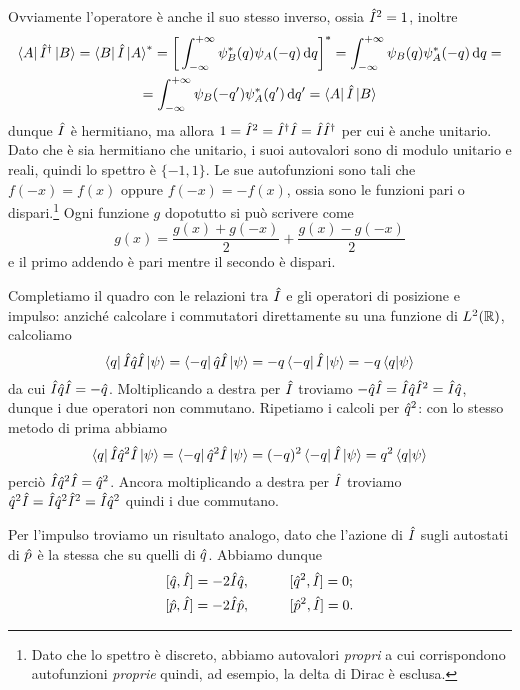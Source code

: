 Ovviamente l'operatore è anche il suo stesso inverso, ossia $\hat{I}^2=1$, inoltre
\begin{multline}
	\left\langle{A}\right|{\hat{I}}^\dagger\left|{B}\right\rangle=\left\langle{B}\right|\hat{I}\left|{A}\right\rangle^*=\bigg[\int_{-\infty}^{+\infty}\psi_B^*(q)\psi_A(-q)\,\textup{d} q\bigg]^*=\int_{-\infty}^{+\infty}\psi_B(q)\psi_A^*(-q)\,\textup{d} q=\\
	=\int_{-\infty}^{+\infty}\psi_B(-q')\psi_A^*(q')\,\textup{d} q'=\left\langle{A}\right|\hat{I}\left|{B}\right\rangle
	\label{eq:operatore-inversione-spaziale-hermitiano}
\end{multline}
dunque $\hat{I}$ è hermitiano, ma allora $1=\hat{I}^2={\hat{I}}^\dagger\hat{I}=\hat{I}{\hat{I}}^\dagger$ per cui è anche unitario.
Dato che è sia hermitiano che unitario, i suoi autovalori sono di modulo unitario e reali, quindi lo spettro è $\{-1,1\}$.
Le sue autofunzioni sono tali che $f(-x)=f(x)$ oppure $f(-x)=-f(x)$, ossia sono le funzioni pari o dispari.\footnote{Dato che lo spettro è discreto, abbiamo autovalori \emph{propri} a cui corrispondono autofunzioni \emph{proprie} quindi, ad esempio, la delta di Dirac è esclusa.}
Ogni funzione $g$ dopotutto si può scrivere come
\begin{equation}
	g(x)=\frac{g(x)+g(-x)}2+\frac{g(x)-g(-x)}2
	\label{eq:decomposizione-funzione-pari-dispari}
\end{equation}
e il primo addendo è pari mentre il secondo è dispari.

Completiamo il quadro con le relazioni tra $\hat{I}$ e gli operatori di posizione e impulso: anzich\'e calcolare i commutatori direttamente su una funzione di $L^2(\mathbb{R})$, calcoliamo
\begin{equation}
	\left\langle{q}\right|\hat{I}\hat{q}\hat{I}\left|{\psi}\right\rangle=\left\langle{-q}\right|\hat{q}\hat{I}\left|{\psi}\right\rangle=-q\left\langle{-q}\right|\hat{I}\left|{\psi}\right\rangle=-q\left\langle{q}\middle|{\psi}\right\rangle
\end{equation}
da cui $\hat{I}\hat{q}\hat{I}=-\hat{q}$.
Moltiplicando a destra per $\hat{I}$ troviamo $-\hat{q}\hat{I}=\hat{I}\hat{q}\hat{I}^2=\hat{I}\hat{q}$, dunque i due operatori non commutano.
Ripetiamo i calcoli per $\hat{q}^2$: con lo stesso metodo di prima abbiamo
\begin{equation}
	\left\langle{q}\right|\hat{I}\hat{q}^2\hat{I}\left|{\psi}\right\rangle=\left\langle{-q}\right|\hat{q}^2\hat{I}\left|{\psi}\right\rangle=(-q)^2\left\langle{-q}\right|\hat{I}\left|{\psi}\right\rangle=q^2\left\langle{q}\middle|{\psi}\right\rangle
\end{equation}
perciò $\hat{I}\hat{q}^2\hat{I}=\hat{q}^2$.
Ancora moltiplicando a destra per $\hat{I}$ troviamo $\hat{q}^2\hat{I}=\hat{I}\hat{q}^2\hat{I}^2=\hat{I}\hat{q}^2$ quindi i due commutano.

Per l'impulso troviamo un risultato analogo, dato che l'azione di $\hat{I}$ sugli autostati di $\hat{p}$ è la stessa che su quelli di $\hat{q}$.
Abbiamo dunque
\begin{equation}
	\begin{gathered}
		[\op q,\op I]=-2\op I\op q,\hspace{1cm}[\op q^2,\op I]=0;\\
		[\op p,\op I]=-2\op I\op p,\hspace{1cm}[\op p^2,\op I]=0.
	\end{gathered}
	\label{eq:commutatori-inversione-posizione-impulso}
\end{equation}
